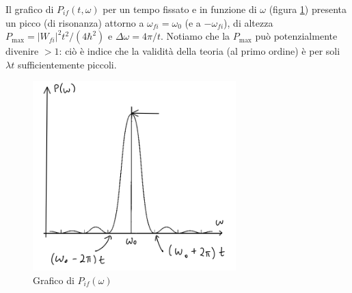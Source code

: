 \documentclass[../../InformazioneQuantistica.tex]{subfiles}
\begin{document}

Il grafico di $P_{if}(t,\omega)$ per un tempo fissato e in funzione di $\omega$ (figura \ref{fig:P-omega}) presenta un picco (di risonanza) attorno a $\omega_{fi} = \omega_0$ (e a $-\omega_{fi}$), di altezza $P_{\max} = |W_{fi}|^2 t^2/(4\hbar^2)$ e  $\Delta \omega = 4\pi/t$. Notiamo che la $P_{\max}$ può potenzialmente divenire $>1$: ciò è indice che la validità della teoria (al primo ordine) è per soli $\lambda t$ sufficientemente piccoli.
\begin{figure}[H]
\centering
\includegraphics[width=0.7\textwidth]{Immagini/12_6/Pomega.PNG}
\caption{Grafico di $P_{if}(\omega)$\label{fig:P-omega}}
\end{figure}
\end{document}
